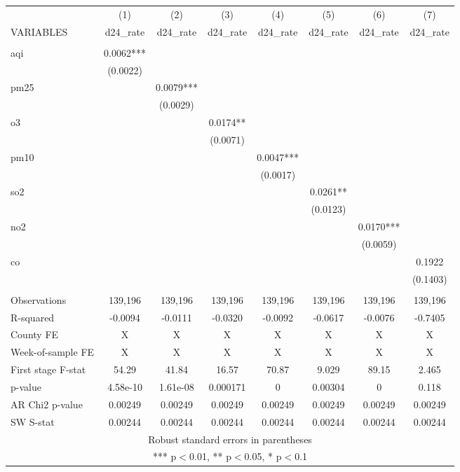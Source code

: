 \documentclass[]{article}
\begin{document}
\begin{tabular}{lccccccc} \hline
 & (1) & (2) & (3) & (4) & (5) & (6) & (7) \\
VARIABLES & d24\_rate & d24\_rate & d24\_rate & d24\_rate & d24\_rate & d24\_rate & d24\_rate \\ \hline
 &  &  &  &  &  &  &  \\
aqi & 0.0062*** &  &  &  &  &  &  \\
 & (0.0022) &  &  &  &  &  &  \\
pm25 &  & 0.0079*** &  &  &  &  &  \\
 &  & (0.0029) &  &  &  &  &  \\
o3 &  &  & 0.0174** &  &  &  &  \\
 &  &  & (0.0071) &  &  &  &  \\
pm10 &  &  &  & 0.0047*** &  &  &  \\
 &  &  &  & (0.0017) &  &  &  \\
so2 &  &  &  &  & 0.0261** &  &  \\
 &  &  &  &  & (0.0123) &  &  \\
no2 &  &  &  &  &  & 0.0170*** &  \\
 &  &  &  &  &  & (0.0059) &  \\
co &  &  &  &  &  &  & 0.1922 \\
 &  &  &  &  &  &  & (0.1403) \\
 &  &  &  &  &  &  &  \\
Observations & 139,196 & 139,196 & 139,196 & 139,196 & 139,196 & 139,196 & 139,196 \\
R-squared & -0.0094 & -0.0111 & -0.0320 & -0.0092 & -0.0617 & -0.0076 & -0.7405 \\
County FE & X & X & X & X & X & X & X \\
Week-of-sample FE & X & X & X & X & X & X & X \\
First stage F-stat & 54.29 & 41.84 & 16.57 & 70.87 & 9.029 & 89.15 & 2.465 \\
p-value & 4.58e-10 & 1.61e-08 & 0.000171 & 0 & 0.00304 & 0 & 0.118 \\
AR Chi2 p-value & 0.00249 & 0.00249 & 0.00249 & 0.00249 & 0.00249 & 0.00249 & 0.00249 \\
 SW S-stat & 0.00244 & 0.00244 & 0.00244 & 0.00244 & 0.00244 & 0.00244 & 0.00244 \\ \hline
\multicolumn{8}{c}{ Robust standard errors in parentheses} \\
\multicolumn{8}{c}{ *** p$<$0.01, ** p$<$0.05, * p$<$0.1} \\
\end{tabular}
\end{document}
